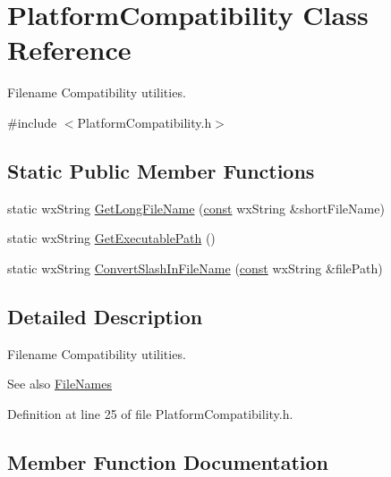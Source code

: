 \hypertarget{class_platform_compatibility}{}\section{Platform\+Compatibility Class Reference}
\label{class_platform_compatibility}


Filename Compatibility utilities.  




{\ttfamily \#include $<$Platform\+Compatibility.\+h$>$}

\subsection*{Static Public Member Functions}
\begin{DoxyCompactItemize}
\item 
static wx\+String \hyperlink{class_platform_compatibility_a7b715c71033d539b2a39d82a6093bd58}{Get\+Long\+File\+Name} (\hyperlink{getopt1_8c_a2c212835823e3c54a8ab6d95c652660e}{const} wx\+String \&short\+File\+Name)
\item 
static wx\+String \hyperlink{class_platform_compatibility_a7fa05bf5f6c95229ba5b4daa76b3f68e}{Get\+Executable\+Path} ()
\item 
static wx\+String \hyperlink{class_platform_compatibility_a5719205ea76ef146b19bf3fd82459b81}{Convert\+Slash\+In\+File\+Name} (\hyperlink{getopt1_8c_a2c212835823e3c54a8ab6d95c652660e}{const} wx\+String \&file\+Path)
\end{DoxyCompactItemize}


\subsection{Detailed Description}
Filename Compatibility utilities. 

\begin{DoxySeeAlso}{See also}
\hyperlink{class_file_names}{File\+Names} 
\end{DoxySeeAlso}


Definition at line 25 of file Platform\+Compatibility.\+h.



\subsection{Member Function Documentation}
